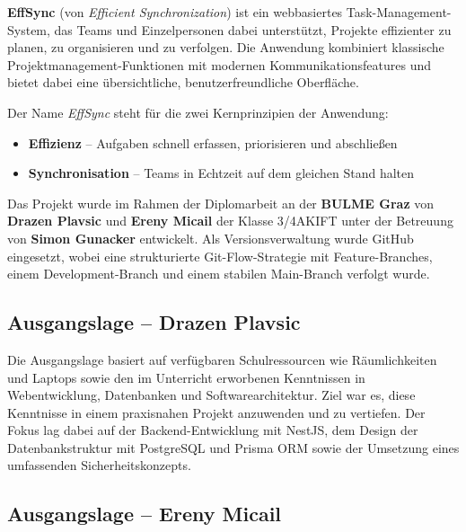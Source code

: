 \label{ch:projektbeschreibung}


\textbf{EffSync} (von \textit{Efficient Synchronization}) ist ein webbasiertes
Task-Management-System, das Teams und Einzelpersonen dabei unterstützt, Projekte
effizienter zu planen, zu organisieren und zu verfolgen. Die Anwendung kombiniert
klassische Projektmanagement-Funktionen mit modernen Kommunikationsfeatures und
bietet dabei eine übersichtliche, benutzerfreundliche Oberfläche.

Der Name \textit{EffSync} steht für die zwei Kernprinzipien der Anwendung:

\begin{itemize}
    \item \textbf{Effizienz} -- Aufgaben schnell erfassen, priorisieren
          und abschließen
    \item \textbf{Synchronisation} -- Teams in Echtzeit auf dem gleichen
          Stand halten
\end{itemize}

Das Projekt wurde im Rahmen der Diplomarbeit an der \textbf{BULME Graz}
von \textbf{Drazen Plavsic} und \textbf{Ereny Micail} der Klasse 3/4AKIFT
unter der Betreuung von \textbf{Simon Gunacker} entwickelt. Als
Versionsverwaltung wurde GitHub eingesetzt, wobei eine strukturierte
Git-Flow-Strategie mit Feature-Branches, einem Development-Branch und
einem stabilen Main-Branch verfolgt wurde.


\subsection{Ausgangslage -- Drazen Plavsic}

Die Ausgangslage basiert auf verfügbaren Schulressourcen wie Räumlichkeiten
und Laptops sowie den im Unterricht erworbenen Kenntnissen in
Webentwicklung, Datenbanken und Softwarearchitektur. Ziel war es, diese
Kenntnisse in einem praxisnahen Projekt anzuwenden und zu vertiefen.
Der Fokus lag dabei auf der Backend-Entwicklung mit NestJS, dem Design
der Datenbankstruktur mit PostgreSQL und Prisma ORM sowie der Umsetzung
eines umfassenden Sicherheitskonzepts.

\subsection{Ausgangslage -- Ereny Micail}

